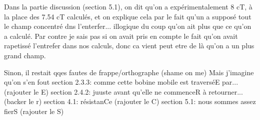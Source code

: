 
Dans la partie discussion (section 5.1), on dit qu'on a expérimentalement 8 cT, à la place des 7.54 cT calculés, et on explique 
cela par le fait qu'un a supposé tout le champ concentré dns l'enterfer... illogique du coup qu'on ait plus que ce qu'on a calculé.
Par contre je sais pas si on avait pris en compte le fait qu'on avait rapetissé l'entrefer dans nos calculs, donc ca vient peut
etre de là qu'on a un plus grand champ.


Sinon, il restait qqes fautes de frappe/orthographe (shame on me) Mais j'imagine qu'on s'en fout
section 2.3.3: comme cette bobine mobile est traverséE par... (rajouter le E)
section 2.4.2: juuste avant qu'elle ne commenceR à retourner... (backer le r)
section 4.1: résistanCe (rajouter le C)
section 5.1: nous sommes assez fierS (rajouter le S)


